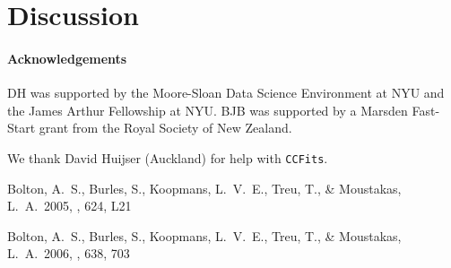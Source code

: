 \documentclass[12pt]{emulateapj}
\begin{document}
\section{Discussion}



\paragraph{Acknowledgements}
DH was supported by the Moore-Sloan Data Science Environment at NYU and the James Arthur Fellowship at NYU.
BJB was supported by a Marsden Fast-Start grant from the Royal Society of
New Zealand.

We thank David Huijser (Auckland) for help with {\tt CCFits}.



\begin{thebibliography}{999}

 Bolton, A.~S., Burles, 
S., Koopmans, L.~V.~E., Treu, T., 
\& Moustakas, L.~A.\ 2005, \apjl, 624, L21 

 Bolton, A.~S., Burles, 
S., Koopmans, L.~V.~E., Treu, T., \& Moustakas, L.~A.\ 2006, \apj, 638, 703 

\end{thebibliography}
\end{document}

